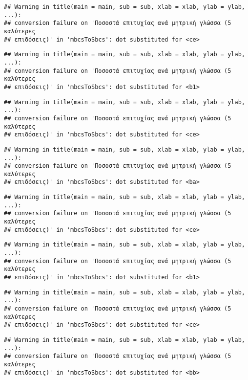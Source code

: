 \documentclass[
]{article}
\begin{document}
\begin{verbatim}
## Warning in title(main = main, sub = sub, xlab = xlab, ylab = ylab, ...):
## conversion failure on 'Ποσοστά επιτυχίας ανά μητρική γλώσσα (5 καλύτερες
## επιδόσεις)' in 'mbcsToSbcs': dot substituted for <ce>
\end{verbatim}

\begin{verbatim}
## Warning in title(main = main, sub = sub, xlab = xlab, ylab = ylab, ...):
## conversion failure on 'Ποσοστά επιτυχίας ανά μητρική γλώσσα (5 καλύτερες
## επιδόσεις)' in 'mbcsToSbcs': dot substituted for <b1>
\end{verbatim}

\begin{verbatim}
## Warning in title(main = main, sub = sub, xlab = xlab, ylab = ylab, ...):
## conversion failure on 'Ποσοστά επιτυχίας ανά μητρική γλώσσα (5 καλύτερες
## επιδόσεις)' in 'mbcsToSbcs': dot substituted for <ce>
\end{verbatim}

\begin{verbatim}
## Warning in title(main = main, sub = sub, xlab = xlab, ylab = ylab, ...):
## conversion failure on 'Ποσοστά επιτυχίας ανά μητρική γλώσσα (5 καλύτερες
## επιδόσεις)' in 'mbcsToSbcs': dot substituted for <ba>
\end{verbatim}

\begin{verbatim}
## Warning in title(main = main, sub = sub, xlab = xlab, ylab = ylab, ...):
## conversion failure on 'Ποσοστά επιτυχίας ανά μητρική γλώσσα (5 καλύτερες
## επιδόσεις)' in 'mbcsToSbcs': dot substituted for <ce>
\end{verbatim}

\begin{verbatim}
## Warning in title(main = main, sub = sub, xlab = xlab, ylab = ylab, ...):
## conversion failure on 'Ποσοστά επιτυχίας ανά μητρική γλώσσα (5 καλύτερες
## επιδόσεις)' in 'mbcsToSbcs': dot substituted for <b1>
\end{verbatim}

\begin{verbatim}
## Warning in title(main = main, sub = sub, xlab = xlab, ylab = ylab, ...):
## conversion failure on 'Ποσοστά επιτυχίας ανά μητρική γλώσσα (5 καλύτερες
## επιδόσεις)' in 'mbcsToSbcs': dot substituted for <ce>
\end{verbatim}

\begin{verbatim}
## Warning in title(main = main, sub = sub, xlab = xlab, ylab = ylab, ...):
## conversion failure on 'Ποσοστά επιτυχίας ανά μητρική γλώσσα (5 καλύτερες
## επιδόσεις)' in 'mbcsToSbcs': dot substituted for <bb>
\end{verbatim}
\end{document}
